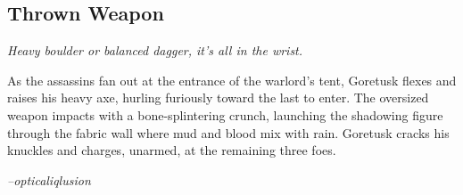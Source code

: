 \subsection{Thrown Weapon}
\textit{Heavy boulder or balanced dagger, it's all in the wrist.}

\begin{quotebox}
As the assassins fan out at the entrance of the warlord's tent, Goretusk flexes and raises his heavy axe, hurling furiously toward the last to enter. The oversized weapon impacts with a bone-splintering crunch, launching the shadowing figure through the fabric wall where mud and blood mix with rain. Goretusk cracks his knuckles and charges, unarmed, at the remaining three foes.

\textit{--opticaliqlusion}
\end{quotebox}
